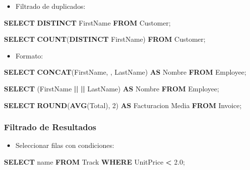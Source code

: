 \documentclass[
]{book}
\newenvironment{Shaded}{\begin{snugshade}}{\end{snugshade}}
\newcommand{\DecValTok}[1]{\textcolor[rgb]{0.00,0.00,0.81}{#1}}
\newcommand{\FloatTok}[1]{\textcolor[rgb]{0.00,0.00,0.81}{#1}}
\newcommand{\FunctionTok}[1]{\textcolor[rgb]{0.13,0.29,0.53}{\textbf{#1}}}
\newcommand{\KeywordTok}[1]{\textcolor[rgb]{0.13,0.29,0.53}{\textbf{#1}}}
\newcommand{\NormalTok}[1]{#1}
\newcommand{\OperatorTok}[1]{\textcolor[rgb]{0.81,0.36,0.00}{\textbf{#1}}}
\newcommand{\StringTok}[1]{\textcolor[rgb]{0.31,0.60,0.02}{#1}}
\providecommand{\tightlist}{%
  \setlength{\itemsep}{0pt}\setlength{\parskip}{0pt}}
\begin{document}
\begin{itemize}
\tightlist
\item
  Filtrado de duplicados:
\end{itemize}

\begin{Shaded}
\begin{Highlighting}[]
  \KeywordTok{SELECT} \KeywordTok{DISTINCT}\NormalTok{ FirstName }\KeywordTok{FROM}\NormalTok{ Customer; }

  \KeywordTok{SELECT} \FunctionTok{COUNT}\NormalTok{(}\KeywordTok{DISTINCT}\NormalTok{ FirstName) }\KeywordTok{FROM}\NormalTok{ Customer; }
\end{Highlighting}
\end{Shaded}

\begin{itemize}
\tightlist
\item
  Formato:
\end{itemize}

\begin{Shaded}
\begin{Highlighting}[]
  \KeywordTok{SELECT} \FunctionTok{CONCAT}\NormalTok{(FirstName, }\StringTok{\textquotesingle{} \textquotesingle{}}\NormalTok{, LastName) }\KeywordTok{AS}\NormalTok{ Nombre }\KeywordTok{FROM}\NormalTok{ Employee; }

  \KeywordTok{SELECT}\NormalTok{ (FirstName }\OperatorTok{||} \StringTok{\textquotesingle{} \textquotesingle{}} \OperatorTok{||}\NormalTok{ LastName) }\KeywordTok{AS}\NormalTok{ Nombre }\KeywordTok{FROM}\NormalTok{ Employee; }

  \KeywordTok{SELECT} \FunctionTok{ROUND}\NormalTok{(}\FunctionTok{AVG}\NormalTok{(Total), }\DecValTok{2}\NormalTok{) }\KeywordTok{AS} \StringTok{\textquotesingle{}Facturacion Media\textquotesingle{}} \KeywordTok{FROM}\NormalTok{ Invoice; }
\end{Highlighting}
\end{Shaded}

\subsubsection{Filtrado de Resultados}\label{filtrado-de-resultados}

\begin{itemize}
\tightlist
\item
  Seleccionar filas con condiciones:
\end{itemize}

\begin{Shaded}
\begin{Highlighting}[]
\KeywordTok{SELECT}\NormalTok{ name }\KeywordTok{FROM}\NormalTok{ Track}
\KeywordTok{WHERE}\NormalTok{ UnitPrice }\OperatorTok{\textless{}} \FloatTok{2.0}\NormalTok{; }
\end{Highlighting}
\end{Shaded}
\end{document}
